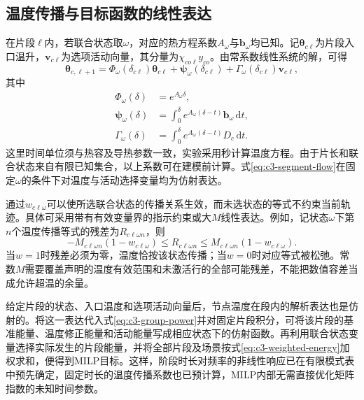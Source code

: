 \subsection{温度传播与目标函数的线性表达}

在片段$\ell$内，若联合状态取$\omega$，对应的热方程系数$A_\omega$与$\boldsymbol b_\omega$均已知。记$\boldsymbol\theta_{c\ell}$为片段入口温升，$\boldsymbol v_{c\ell}$为选项活动向量，其分量为$\chi_{co\ell}y_{co}$。由常系数线性系统的解，可得
\begin{equation}
 \boldsymbol\theta_{c,\ell+1}
 =\Phi_{\omega}(\delta_{c\ell})\boldsymbol\theta_{c\ell}
  +\boldsymbol\psi_{\omega}(\delta_{c\ell})
  +\Gamma_{\omega}(\delta_{c\ell})\boldsymbol v_{c\ell},
 \label{eq:c3-segment-flow}
\end{equation}
其中
\begin{equation}
 \begin{aligned}
 \Phi_{\omega}(\delta)&=e^{A_\omega\delta},\\
 \boldsymbol\psi_{\omega}(\delta)
  &=\int_0^\delta e^{A_\omega(\delta-t)}
                         \boldsymbol b_\omega\,\mathrm dt,\\
 \Gamma_{\omega}(\delta)
  &=\int_0^\delta e^{A_\omega(\delta-t)}
                         D_c\,\mathrm dt.
 \end{aligned}
 \label{eq:c3-segment-coeff}
\end{equation}
这里时间单位须与热容及导热参数一致，实验采用秒计算温度方程。由于片长和联合状态来自有限已知集合，以上系数可在建模前计算。式\eqref{eq:c3-segment-flow}在固定$\omega$的条件下对温度与活动选择变量均为仿射表达。

通过$w_{c\ell\omega}$可以使所选联合状态的传播关系生效，而未选状态的等式不约束当前轨迹。具体可采用带有有效变量界的指示约束或大$M$线性表达。例如，记状态$\omega$下第$n$个温度传播等式的残差为$R_{c\ell\omega n}$，则
\begin{equation}
 -M_{c\ell\omega n}(1-w_{c\ell\omega})
 \le R_{c\ell\omega n}
 \le M_{c\ell\omega n}(1-w_{c\ell\omega}).
 \label{eq:c3-bigM}
\end{equation}
当$w=1$时残差必须为零，温度恰按该状态传播；当$w=0$时对应等式被松弛。常数$M$需要覆盖声明的温度有效范围和未激活行的全部可能残差，不能把数值容差当成允许超温的余量。

给定片段的状态、入口温度和选项活动向量后，节点温度在段内的解析表达也是仿射的。将这一表达代入式\eqref{eq:c3-group-power}并对固定片段积分，可将该片段的基准能量、温度修正能量和活动能量写成相应状态下的仿射函数。再利用联合状态变量选择实际发生的片段能量，并将全部片段及场景按式\eqref{eq:c3-weighted-energy}加权求和，便得到MILP目标。这样，阶段时长对频率的非线性响应已在有限模式表中预先确定，固定时长的温度传播系数也已预计算，MILP内部无需直接优化矩阵指数的未知时间参数。

